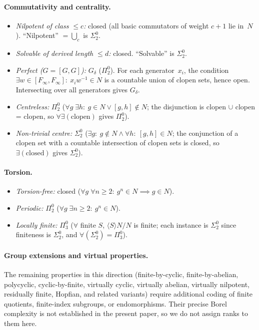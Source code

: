 \documentclass[12pt,fleqn,a4paper]{amsart}
\renewcommand{\le}{\leqslant}
\renewcommand{\ge}{\geqslant}
\numberwithin{equation}{section}
\theoremstyle{definition}
\begin{document}
\paragraph{Commutativity and centrality.}
\begin{itemize}
\item \emph{Nilpotent of class $\le c$:} closed (all basic commutators of weight
$c\!+\!1$ lie in~$N$).  ``Nilpotent'' $=\bigcup_c$ is $\Sigma^0_2$.
\item \emph{Solvable of derived length $\le d$:} closed.  ``Solvable'' is $\Sigma^0_2$.
\item \emph{Perfect ($G=[G,G]$):} $G_\delta$ ($\Pi^0_2$).
For each generator~$x_i$, the condition
$\exists w\in[F_\infty,F_\infty]:\ x_iw^{-1}\in N$ is a countable union of clopen sets,
hence open.
Intersecting over all generators gives $G_\delta$.
\item \emph{Centreless:} $\Pi^0_2$
($\forall g\;\exists h:\ g\in N\lor [g,h]\notin N$; the disjunction is
clopen $\cup$ clopen = clopen, so $\forall\exists(\text{clopen})$ gives $\Pi^0_2$).
\item \emph{Non-trivial centre:} $\Sigma^0_2$
($\exists g:\ g\notin N\land\forall h:\ [g,h]\in N$; the conjunction of a
clopen set with a countable intersection of clopen sets is closed,
so $\exists(\text{closed})$ gives $\Sigma^0_2$).
\end{itemize}

\paragraph{Torsion.}
\begin{itemize}
\item \emph{Torsion-free:} closed
($\forall g\;\forall n\ge 2:\ g^n\in N\implies g\in N$).
\item \emph{Periodic:} $\Pi^0_2$ ($\forall g\;\exists n\ge 2:\ g^n\in N$).
\item \emph{Locally finite:} $\Pi^0_3$ ($\forall$ finite $S$, $\langle S\rangle N/N$
is finite; each instance is $\Sigma^0_2$ since finiteness is $\Sigma^0_2$,
and $\forall(\Sigma^0_2)=\Pi^0_3$).
\end{itemize}

\paragraph{Group extensions and virtual properties.}
The remaining properties in this direction
(finite-by-cyclic, finite-by-abelian, polycyclic, cyclic-by-finite, virtually
cyclic, virtually abelian, virtually nilpotent, residually finite, Hopfian, and
related variants) require additional coding of finite quotients, finite-index
subgroups, or endomorphisms.  Their precise Borel complexity is not established
in the present paper, so we do not assign ranks to them here.
\end{document}
